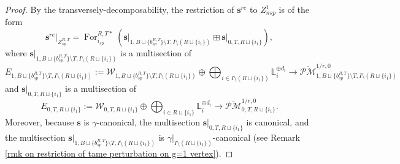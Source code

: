\documentclass[11pt]{amsart}
\theoremstyle{definition}
\theoremstyle{remark}
\newcommand{\oPMb}{{\overline{\mathcal{PM}}}}
\newcommand{\<}{\left<}
\renewcommand{\>}{\right>}
\numberwithin{equation}{section}
\begin{document}
\begin{proof}
         
         By the transversely-decomposability, the restriction of $\bm{s}^{re}$ to ${Z}^1_{nsp}$ is of the form
         \begin{equation}\label{eq split of remaining section at sp locus}
         \bm{s}^{re}\vert_{Z_{sp}^{R,T}}= \operatorname{For}_{i_{sp}}^{R,T*} \left( \bm{s}\vert_{1,B\sqcup \{b^{R,T}_{sp}\} \setminus T,I\setminus (R\sqcup \{i_1\})} \boxplus \bm{s}\vert_{0,T,R\sqcup \{i_1\}} \right),
         \end{equation}
         where $\bm{s}\vert_{1,B\sqcup \{b^{R,T}_{sp}\} \setminus T,I\setminus (R\sqcup \{i_1\})}$ is a multisection %
of 
         $$
         E_{1,B\sqcup \{b^{R,T}_{sp}\} \setminus T,I\setminus (R\sqcup \{i_1\})} := \mathcal W_{1,B\sqcup \{b^{R,T}_{sp}\} \setminus T,I\setminus (R\sqcup \{i_1\})}\oplus \bigoplus_{i\in I\setminus (R\sqcup \{i_1\})} \mathbb L_i^{\oplus d_i}\to \oPMb^{1/r,0}_{1,B\sqcup \{b^{R,T}_{sp}\} \setminus T,I\setminus (R\sqcup \{i_1\})}
         $$
         and %
          $\bm{s}\vert_{0,T,R\sqcup \{i_1\}}$ is a multisection of 
         $$
         E_{0,T,R\sqcup \{i_1\}} := \mathcal W_{0,T,R\sqcup \{i_1\}} \oplus \bigoplus_{i \in R\sqcup \{i_1\}} \mathbb L_i^{\oplus d_i}\to \oPMb^{1/r,0}_{0,T,R\sqcup \{i_1\}}.
         $$
         Moreover, because $\bm{s}$ is $\gamma$-canonical, the multisection $\bm{s}\vert_{0,T,R\sqcup \{i_1\}}$ is canonical, and the multisection $\bm{s}\vert_{1,B\sqcup \{b^{R,T}_{sp}\} \setminus T,I\setminus (R\sqcup \{i_1\})}$ is $\gamma\vert_{I\setminus (R\sqcup \{i_1\})}$-canonical (see Remark \ref{rmk on restriction of tame perturbation on g=1 vertex}).


\end{proof}
\end{document}
